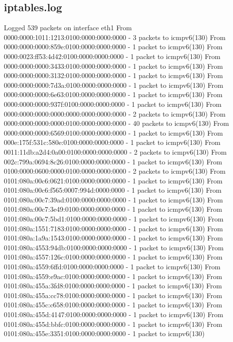 \subsection{iptables.log}

 Logged 539 packets on interface eth1
   From 0000:0000:1011:1213:0100:0000:0000:0000 - 3 packets to icmpv6(130)
   From 0000:0000:0000:859e:0100:0000:0000:0000 - 1 packet to icmpv6(130)
   From 0000:0023:ff53:4d42:0100:0000:0000:0000 - 1 packet to icmpv6(130)
   From 0000:0000:0000:3433:0100:0000:0000:0000 - 1 packet to icmpv6(130)
   From 0000:0000:0000:3132:0100:0000:0000:0000 - 1 packet to icmpv6(130)
   From 0000:0000:0000:7d3a:0100:0000:0000:0000 - 1 packet to icmpv6(130)
   From 0000:0000:0000:6e63:0100:0000:0000:0000 - 1 packet to icmpv6(130)
   From 0000:0000:0000:937f:0100:0000:0000:0000 - 1 packet to icmpv6(130)
   From 0000:0000:0000:0000:0000:0000:0000:0000 - 2 packets to icmpv6(130)
   From 0000:0000:0000:0000:0100:0000:0000:0000 - 40 packets to icmpv6(130)
   From 0000:0000:0000:6569:0100:0000:0000:0000 - 1 packet to icmpv6(130)
   From 000e:175f:531c:580e:0100:0000:0000:0000 - 1 packet to icmpv6(130)
   From 0011:11db:a2d4:0a00:0100:0000:0000:0000 - 2 packets to icmpv6(130)
   From 002c:799a:0694:8c26:0100:0000:0000:0000 - 1 packet to icmpv6(130)
   From 0100:0000:0600:0000:0100:0000:0000:0000 - 2 packets to icmpv6(130)
   From 0101:080a:00c6:0621:0100:0000:0000:0000 - 1 packet to icmpv6(130)
   From 0101:080a:00c6:f565:0007:994d:0000:0000 - 1 packet to icmpv6(130)
   From 0101:080a:00c7:39ad:0100:0000:0000:0000 - 1 packet to icmpv6(130)
   From 0101:080a:00c7:3e49:0100:0000:0000:0000 - 1 packet to icmpv6(130)
   From 0101:080a:00c7:5bd1:0100:0000:0000:0000 - 1 packet to icmpv6(130)
   From 0101:080a:1551:7183:0100:0000:0000:0000 - 1 packet to icmpv6(130)
   From 0101:080a:1a9a:1543:0100:0000:0000:0000 - 1 packet to icmpv6(130)
   From 0101:080a:4553:94db:0100:0000:0000:0000 - 1 packet to icmpv6(130)
   From 0101:080a:4557:126c:0100:0000:0000:0000 - 1 packet to icmpv6(130)
   From 0101:080a:4559:6ffd:0100:0000:0000:0000 - 1 packet to icmpv6(130)
   From 0101:080a:4559:e9ac:0100:0000:0000:0000 - 1 packet to icmpv6(130)
   From 0101:080a:455a:3fd8:0100:0000:0000:0000 - 1 packet to icmpv6(130)
   From 0101:080a:455a:cc78:0100:0000:0000:0000 - 1 packet to icmpv6(130)
   From 0101:080a:455c:c658:0100:0000:0000:0000 - 1 packet to icmpv6(130)
   From 0101:080a:455d:4147:0100:0000:0000:0000 - 1 packet to icmpv6(130)
   From 0101:080a:455d:bbfc:0100:0000:0000:0000 - 1 packet to icmpv6(130)
   From 0101:080a:455e:3351:0100:0000:0000:0000 - 1 packet to icmpv6(130)
